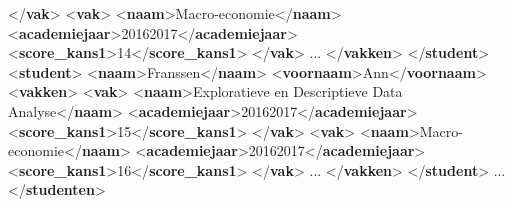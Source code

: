 \documentclass[]{tufte-book}
\newenvironment{Shaded}{}{}
\newcommand{\KeywordTok}[1]{\textcolor[rgb]{0.00,0.44,0.13}{\textbf{#1}}}
\newcommand{\NormalTok}[1]{#1}
\begin{document}
\begin{Shaded}
\begin{Highlighting}[]
\NormalTok{      \textless{}/}\KeywordTok{vak}\NormalTok{\textgreater{}}
\NormalTok{      \textless{}}\KeywordTok{vak}\NormalTok{\textgreater{}}
\NormalTok{        \textless{}}\KeywordTok{naam}\NormalTok{\textgreater{}Macro{-}economie\textless{}/}\KeywordTok{naam}\NormalTok{\textgreater{}}
\NormalTok{        \textless{}}\KeywordTok{academiejaar}\NormalTok{\textgreater{}20162017\textless{}/}\KeywordTok{academiejaar}\NormalTok{\textgreater{}}
\NormalTok{        \textless{}}\KeywordTok{score\_kans1}\NormalTok{\textgreater{}14\textless{}/}\KeywordTok{score\_kans1}\NormalTok{\textgreater{}}
\NormalTok{      \textless{}/}\KeywordTok{vak}\NormalTok{\textgreater{}}
\NormalTok{      ...}
\NormalTok{    \textless{}/}\KeywordTok{vakken}\NormalTok{\textgreater{}}
\NormalTok{  \textless{}/}\KeywordTok{student}\NormalTok{\textgreater{}}
\NormalTok{  \textless{}}\KeywordTok{student}\NormalTok{\textgreater{}}
\NormalTok{    \textless{}}\KeywordTok{naam}\NormalTok{\textgreater{}Franssen\textless{}/}\KeywordTok{naam}\NormalTok{\textgreater{}}
\NormalTok{    \textless{}}\KeywordTok{voornaam}\NormalTok{\textgreater{}Ann\textless{}/}\KeywordTok{voornaam}\NormalTok{\textgreater{}}
\NormalTok{    \textless{}}\KeywordTok{vakken}\NormalTok{\textgreater{}}
\NormalTok{      \textless{}}\KeywordTok{vak}\NormalTok{\textgreater{}}
\NormalTok{        \textless{}}\KeywordTok{naam}\NormalTok{\textgreater{}Exploratieve en Descriptieve Data Analyse\textless{}/}\KeywordTok{naam}\NormalTok{\textgreater{}}
\NormalTok{        \textless{}}\KeywordTok{academiejaar}\NormalTok{\textgreater{}20162017\textless{}/}\KeywordTok{academiejaar}\NormalTok{\textgreater{}}
\NormalTok{        \textless{}}\KeywordTok{score\_kans1}\NormalTok{\textgreater{}15\textless{}/}\KeywordTok{score\_kans1}\NormalTok{\textgreater{}}
\NormalTok{      \textless{}/}\KeywordTok{vak}\NormalTok{\textgreater{}}
\NormalTok{      \textless{}}\KeywordTok{vak}\NormalTok{\textgreater{}}
\NormalTok{        \textless{}}\KeywordTok{naam}\NormalTok{\textgreater{}Macro{-}economie\textless{}/}\KeywordTok{naam}\NormalTok{\textgreater{}}
\NormalTok{        \textless{}}\KeywordTok{academiejaar}\NormalTok{\textgreater{}20162017\textless{}/}\KeywordTok{academiejaar}\NormalTok{\textgreater{}}
\NormalTok{        \textless{}}\KeywordTok{score\_kans1}\NormalTok{\textgreater{}16\textless{}/}\KeywordTok{score\_kans1}\NormalTok{\textgreater{}}
\NormalTok{      \textless{}/}\KeywordTok{vak}\NormalTok{\textgreater{}}
\NormalTok{      ...}
\NormalTok{    \textless{}/}\KeywordTok{vakken}\NormalTok{\textgreater{}}
\NormalTok{  \textless{}/}\KeywordTok{student}\NormalTok{\textgreater{}}
\NormalTok{  ...}
\NormalTok{\textless{}/}\KeywordTok{studenten}\NormalTok{\textgreater{}}
\end{Highlighting}
\end{Shaded}
\end{document}
